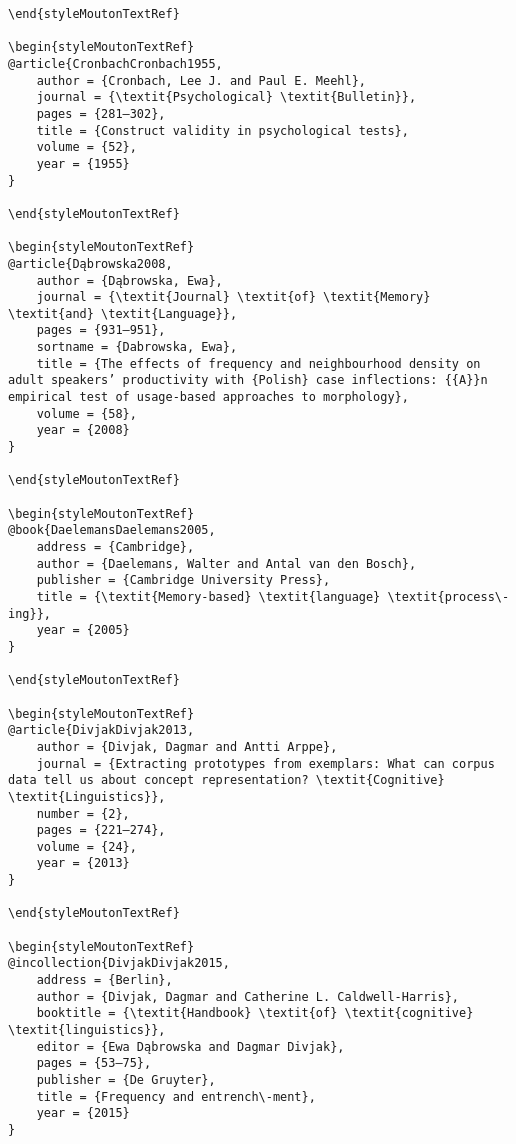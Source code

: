 \begin{styleMoutonHeadingi}
\begin{verbatim}
\end{styleMoutonTextRef}

\begin{styleMoutonTextRef}
@article{CronbachCronbach1955,
	author = {Cronbach, Lee J. and Paul E. Meehl},
	journal = {\textit{Psychological} \textit{Bulletin}},
	pages = {281–302},
	title = {Construct validity in psychological tests},
	volume = {52},
	year = {1955}
}

\end{styleMoutonTextRef}

\begin{styleMoutonTextRef}
@article{Dąbrowska2008,
	author = {Dąbrowska, Ewa},
	journal = {\textit{Journal} \textit{of} \textit{Memory} \textit{and} \textit{Language}},
	pages = {931–951},
	sortname = {Dabrowska, Ewa},
	title = {The effects of frequency and neighbourhood density on adult speakers’ productivity with {Polish} case inflections: {{A}}n empirical test of usage-based approaches to morphology},
	volume = {58},
	year = {2008}
}

\end{styleMoutonTextRef}

\begin{styleMoutonTextRef}
@book{DaelemansDaelemans2005,
	address = {Cambridge},
	author = {Daelemans, Walter and Antal van den Bosch},
	publisher = {Cambridge University Press},
	title = {\textit{Memory-based} \textit{language} \textit{process\-ing}},
	year = {2005}
}

\end{styleMoutonTextRef}

\begin{styleMoutonTextRef}
@article{DivjakDivjak2013,
	author = {Divjak, Dagmar and Antti Arppe},
	journal = {Extracting prototypes from exemplars: What can corpus data tell us about concept representation? \textit{Cognitive} \textit{Linguistics}},
	number = {2},
	pages = {221–274},
	volume = {24},
	year = {2013}
}

\end{styleMoutonTextRef}

\begin{styleMoutonTextRef}
@incollection{DivjakDivjak2015,
	address = {Berlin},
	author = {Divjak, Dagmar and Catherine L. Caldwell-Harris},
	booktitle = {\textit{Handbook} \textit{of} \textit{cognitive} \textit{linguistics}},
	editor = {Ewa Dąbrowska and Dagmar Divjak},
	pages = {53–75},
	publisher = {De Gruyter},
	title = {Frequency and entrench\-ment},
	year = {2015}
}


\end{verbatim}
\end{styleMoutonHeadingi}
